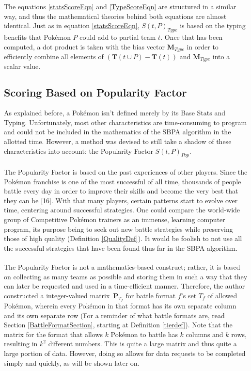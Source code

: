 \documentclass{article}
\begin{document}
The equations \ref{statsScoreEqn} and \ref{TypeScoreEqn} are structured in a similar way, and thus the mathematical theories behind both equations are almost identical. Just as in equation \ref{statsScoreEqn}, $S(t,P)_{Type}$ is based on the typing benefits that Pok\'emon $P$ could add to partial team $t$. Once that has been computed, a dot product is taken with the bias vector $\textbf{M}_{Type}$ in order to efficiently combine all elements of $(\textbf{T}(t\cup P)-\textbf{T}(t))$ and $\textbf{M}_{Type}$ into a scalar value.

\subsection{Scoring Based on Popularity Factor}
As explained before, a Pok\'emon isn't defined merely by its Base Stats and Typing. Unfortunately, most other characteristics are time-consuming to program and could not be included in the mathematics of the SBPA algorithm in the allotted time. However, a method was devised to still take a shadow of these characteristics into account: the Popularity Factor $S(t,P)_{Pop}$.\\\\
The Popularity Factor is based on the past experiences of other players. Since the Pok\'emon franchise is one of the most successful of all time, thousands of people battle every day in order to improve their skills and become the very best that they can be [16]. With that many players, certain patterns start to evolve over time, centering around successful strategies. One could compare the world-wide group of Competitive Pok\'emon trainers as an immense, learning computer program, its purpose being to seek out new battle strategies while preserving those of high quality (Definition \ref{QualityDef}). It would be foolish to not use all the successful strategies that have been found thus far in the SBPA algorithm.\\\\
The Popularity Factor is not a mathematics-based construct; rather, it is based on collecting as many teams as possible and storing them in such a way that they can later be requested and used in a time-efficient manner. Therefore, the author constructed a integer-valued matrix~$\textbf{P}_{T_f}$ for battle format $f$'s set $T_f$ of allowed Pok\'emon, wherein every Pok\'emon in that format has its own separate column and its own separate row (For a reminder of what battle formats are, read Section \ref{BattleFormatSection}, starting at Definition \ref{tierdef}). Note that the matrix for the format that allows $k$ Pok\'emon to battle has $k$ columns and $k$ rows, resulting in $k^2$ different numbers. This is quite a large matrix and thus quite a large portion of data. However, doing so allows for data requests to be completed simply and quickly, as will be shown later on.\\\\
\end{document}
